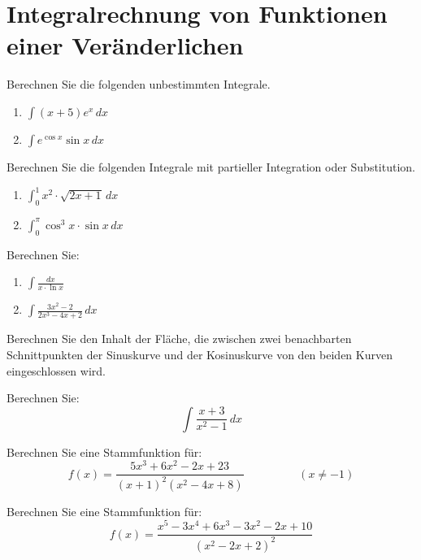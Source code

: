 \section{Integralrechnung von Funktionen einer
Veränderlichen}

\begin{ejercicio}
Berechnen Sie die folgenden unbestimmten Integrale.
\begin{enumerate}
    \item $\displaystyle \int (x + 5) e^x \, dx$
    \item $\displaystyle \int e^{\cos x} \sin x \, dx$
\end{enumerate}
\end{ejercicio}

\begin{ejercicio}
Berechnen Sie die folgenden Integrale mit partieller Integration oder Substitution.
\begin{enumerate}
    \item $\displaystyle \int_0^1 x^2 \cdot \sqrt{2x + 1} \, dx$
    \item $\displaystyle \int_0^\pi \cos^3 x \cdot \sin x \, dx$
\end{enumerate}
\end{ejercicio}

\begin{ejercicio}
Berechnen Sie:
\begin{enumerate}
    \item $\displaystyle \int \frac{dx}{x \cdot \ln x}$
    \item $\displaystyle \int \frac{3x^2 - 2}{2x^3 - 4x + 2} \, dx$
\end{enumerate}
\end{ejercicio}

\begin{ejercicio}
Berechnen Sie den Inhalt der Fläche, die zwischen zwei benachbarten Schnittpunkten der Sinuskurve und der Kosinuskurve von den beiden Kurven eingeschlossen wird.
\end{ejercicio}

\begin{ejercicio}
Berechnen Sie:
\[
    \int \frac{x + 3}{x^2 - 1} \, dx
\]
\end{ejercicio}

\begin{ejercicio}[Partialbruchzerlegung]
Berechnen Sie eine Stammfunktion für:
\[
    f(x) = \frac{5x^3 + 6x^2 - 2x + 23}{(x + 1)^2 (x^2 - 4x + 8)} \hspace{2cm} (x \neq -1)
\]
\end{ejercicio}

\begin{ejercicio}
Berechnen Sie eine Stammfunktion für:
\[
    f(x) = \frac{x^5 - 3x^4 + 6x^3 - 3x^2 - 2x + 10}{(x^2 - 2x + 2)^2}
\]
\end{ejercicio}